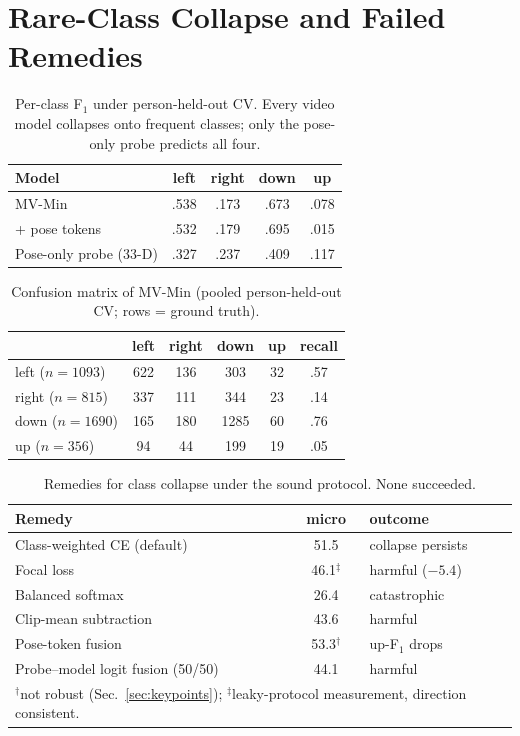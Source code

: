 \documentclass[journal]{IEEEtran}
\newcommand{\mvmin}{MV-Min}
\begin{document}
\section{Rare-Class Collapse and Failed Remedies}
\label{sec:collapse}

\begin{table}[t]
\caption{Per-class F$_1$ under person-held-out CV.  Every video model
collapses onto frequent classes; only the pose-only probe predicts all
four.}
\label{tab:collapse}
\centering\footnotesize
\begin{tabular}{lcccc}
\toprule
Model & left & right & down & up \\
\midrule
\mvmin{}               & .538 & .173 & .673 & .078 \\
\;+ pose tokens        & .532 & .179 & .695 & .015 \\
Pose-only probe (33-D) & .327 & .237 & .409 & .117 \\
\bottomrule
\end{tabular}
\end{table}

\begin{table}[t]
\caption{Confusion matrix of \mvmin{} (pooled person-held-out CV;
rows = ground truth).}
\label{tab:confusion}
\centering\footnotesize
\begin{tabular}{lccccc}
\toprule
 & left & right & down & up & recall \\
\midrule
left  ($n{=}1093$) &  622 & 136 &  303 & 32 & .57 \\
right ($n{=}815$)  &  337 & 111 &  344 & 23 & .14 \\
down  ($n{=}1690$) &  165 & 180 & 1285 & 60 & .76 \\
up    ($n{=}356$)  &   94 &  44 &  199 & 19 & .05 \\
\bottomrule
\end{tabular}
\end{table}

\begin{table}[t]
\caption{Remedies for class collapse under the sound protocol.  None
succeeded.}
\label{tab:remedies}
\centering\footnotesize\setlength{\tabcolsep}{4pt}
\begin{tabular}{lcl}
\toprule
Remedy & micro & outcome \\
\midrule
Class-weighted CE (default)       & 51.5 & collapse persists \\
Focal loss~\cite{lin2017focal}    & 46.1$^{\ddagger}$ & harmful ($-5.4$) \\
Balanced softmax~\cite{ren2020balanced} & 26.4 & catastrophic \\
Clip-mean subtraction             & 43.6 & harmful \\
Pose-token fusion                 & 53.3$^{\dagger}$ & up-F$_1$ drops \\
Probe--model logit fusion (50/50) & 44.1 & harmful \\
\bottomrule
\multicolumn{3}{l}{\footnotesize $^{\dagger}$not robust
(Sec.~\ref{sec:keypoints}); $^{\ddagger}$leaky-protocol measurement,
direction consistent.}
\end{tabular}
\end{table}
\end{document}
